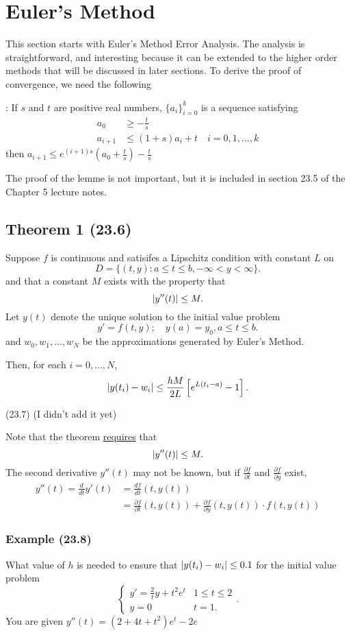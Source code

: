 \section{Euler's Method}
This section starts with Euler's Method Error Analysis. The analysis is
straightforward, and interesting because it can be extended to the higher order
methods that will be discussed in later sections. To derive the proof of
convergence, we need the following

\lemma: If $s$ and $t$ are positive real numbers, $\{a_i\}_{i=0}^k$ is a
sequence satisfying
\begin{align*}
  a_0 &\geq -\frac{t}{s} \\
  a_{i+1} &\leq (1+s) a_i + t \quad i = 0, 1, \ldots, k
\end{align*}
then $\displaystyle a_{i+1}\leq e^{(i+1)s}\left(a_0 + \frac{t}{s}\right) - \frac{t}{s}$

The proof of the lemme is not important, but it is included in section 23.5 of
the Chapter 5 lecture notes.

\subsection{Theorem 1 (23.6)}
Suppose $f$ is continuous and satisifes a Lipschitz condition with constant $L$
on
\[
D = \{(t,y) : a \leq t \leq b, -\infty < y < \infty \}
.\]
and that a constant $M$ exists with the property that
\[
  \abs{y''(t)} \leq M
.\]
Let $y(t)$ denote the unique solution to the initial value problem
\[
  y' = f(t,y); \quad y(a) = y_0, a \leq t \leq b
.\]
and $w_0, w_1, \dots, w_N$ be the approximations generated by Euler's Method.

Then, for each $i=0, \dots, N$, 
\[
  \abs{y(t_i) - w_i} \leq \frac{hM}{2L}\left[e^{L(t_i-a)}-1\right]
.\]

\proof (23.7) (I didn't add it yet)

Note that the theorem \uline{requires} that  
\[
  \abs{y''(t)} \leq M
.\]
The second derivative $y''(t)$ may not be known, but if $\frac{\partial
f}{\partial t}$ and $\frac{\partial f}{\partial y}$ exist,
\begin{align*}
  y''(t) = \frac{d}{dt} y'(t) &= \frac{df}{dt}(t,y(t)) \\
                              &= \frac{\partial f}{\partial
  t}(t,y(t)) + \frac{\partial f}{\partial y}(t,y(t)) \cdot f(t,y(t))
\end{align*}

\subsubsection{Example (23.8)}
What value of $h$ is needed to ensure that $\abs{y(t_i) - w_i} \leq 0.1$ for the
initial value problem
\[
  \begin{cases}
    y' = \frac{2}{t} y + t^2 e^t & 1 \leq t \leq 2 \\
    y = 0 & t = 1
  .\end{cases}
.\]
You are given $y''(t) = (2+4t+t^2)e^t - 2e$

